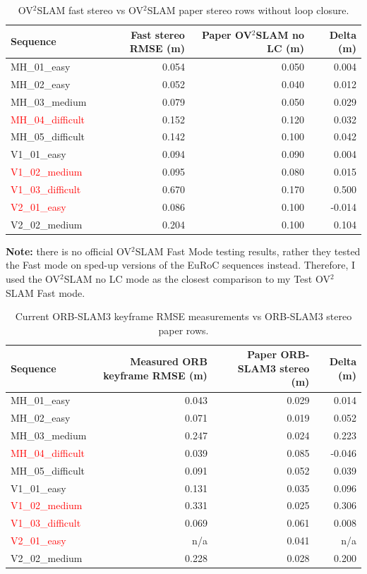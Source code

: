 \documentclass[11pt]{article}
\begin{document}
\begin{table}[H]
\centering
\small
\caption{OV$^{2}$SLAM fast stereo vs OV$^{2}$SLAM paper stereo rows without loop closure.}
\label{tab:ov2_fast_vs_paper}
\begin{tabular}{lrrr}
\toprule
Sequence & Fast stereo RMSE (m) & Paper OV$^{2}$SLAM no LC (m) & Delta (m) \\
\midrule
MH\_01\_easy & 0.054 & 0.050 & 0.004 \\
MH\_02\_easy & 0.052 & 0.040 & 0.012 \\
MH\_03\_medium & 0.079 & 0.050 & 0.029 \\
\textcolor{red}{MH\_04\_difficult} & 0.152 & 0.120 & 0.032 \\
MH\_05\_difficult & 0.142 & 0.100 & 0.042 \\
V1\_01\_easy & 0.094 & 0.090 & 0.004 \\
\textcolor{red}{V1\_02\_medium} & 0.095 & 0.080 & 0.015 \\
\textcolor{red}{V1\_03\_difficult} & 0.670 & 0.170 & 0.500 \\
\textcolor{red}{V2\_01\_easy} & 0.086 & 0.100 & -0.014 \\
V2\_02\_medium & 0.204 & 0.100 & 0.104 \\
\bottomrule
\end{tabular}
\end{table}
\textbf{Note:} there is no official OV$^{2}$SLAM Fast Mode testing results, rather they tested the Fast mode on sped-up versions of the EuRoC sequences instead. Therefore, I used the OV$^{2}$SLAM no LC mode as the closest comparison to my Test OV$^{2}$SLAM Fast mode.

\begin{table}[H]
\centering
\small
\caption{Current ORB-SLAM3 keyframe RMSE measurements vs ORB-SLAM3 stereo paper rows.}
\label{tab:orb_vs_paper_accuracy}
\begin{tabular}{lrrr}
\toprule
Sequence & Measured ORB keyframe RMSE (m) & Paper ORB-SLAM3 stereo (m) & Delta (m) \\
\midrule
MH\_01\_easy & 0.043 & 0.029 & 0.014 \\
MH\_02\_easy & 0.071 & 0.019 & 0.052 \\
MH\_03\_medium & 0.247 & 0.024 & 0.223 \\
\textcolor{red}{MH\_04\_difficult} & 0.039 & 0.085 & -0.046 \\
MH\_05\_difficult & 0.091 & 0.052 & 0.039 \\
V1\_01\_easy & 0.131 & 0.035 & 0.096 \\
\textcolor{red}{V1\_02\_medium} & 0.331 & 0.025 & 0.306 \\
\textcolor{red}{V1\_03\_difficult} & 0.069 & 0.061 & 0.008 \\
\textcolor{red}{V2\_01\_easy} & n/a & 0.041 & n/a \\
V2\_02\_medium & 0.228 & 0.028 & 0.200 \\
\bottomrule
\end{tabular}
\end{table}
\end{document}
